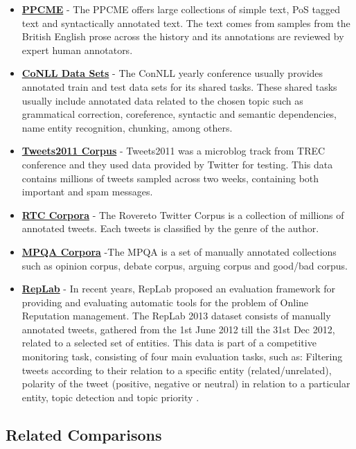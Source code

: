 \begin{itemize}
    \item \textbf{\href{http://www.ling.upenn.edu/hist-corpora/PPCME2-RELEASE-3/index.html}{PPCME}} - The PPCME offers large collections of simple text, PoS tagged text and syntactically annotated text. The text comes from samples from the British English prose across the history and its annotations are reviewed by expert human annotators.
    \item \textbf{\href{http://www.cs.cmu.edu/~webkb}{CoNLL Data Sets}} - The ConNLL yearly conference usually provides annotated train and test data sets for its shared tasks. These shared tasks usually include annotated data related to the chosen topic such as grammatical correction, coreference, syntactic and semantic dependencies, name entity recognition, chunking, among others.
    \item \textbf{\href{http://trec.nist.gov/data/tweets}{Tweets2011 Corpus}} - Tweets2011 was a microblog track from TREC conference and they used data provided by Twitter for testing. This data contains millions of tweets sampled across two weeks, containing both important and spam messages.
    \item \textbf{\href{http://clic.cimec.unitn.it/amac/twitter_ngram}{RTC Corpora}} - The Rovereto Twitter Corpus is a collection of millions of annotated tweets. Each tweets is classified by the genre of the author.
    \item \textbf{\href{http://mpqa.cs.pitt.edu/corpora}{MPQA Corpora}} -The MPQA is a set of manually annotated collections such as opinion corpus, debate corpus, arguing corpus and good/bad corpus.
    \item \textbf{\href{http://nlp.uned.es/replab2013}{RepLab}} - In recent years, RepLab proposed an evaluation framework for providing and evaluating automatic tools for the problem of Online Reputation management. The RepLab 2013 dataset consists of manually annotated tweets, gathered from the 1st June 2012 till the 31st Dec 2012, related to a selected set of entities. This data is part of a competitive monitoring task, consisting of four main evaluation tasks, such as: Filtering tweets according to their relation to a specific entity (related/unrelated), polarity of the tweet (positive, negative or neutral) in relation to a particular entity, topic detection and topic priority \citep{replab2013overview}. 
\end{itemize}

\subsection{Related Comparisons}


